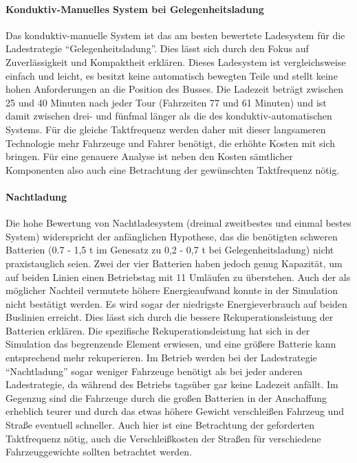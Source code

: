 \paragraph{Konduktiv-Manuelles System bei Gelegenheitsladung} Das konduktiv-manuelle System ist das am besten bewertete Ladesystem für die Ladestrategie "`Gelegenheitsladung"'. Dies lässt sich durch den Fokus auf Zuverlässigkeit und Kompaktheit erklären. Dieses Ladesystem ist vergleichsweise einfach und leicht, es besitzt keine automatisch bewegten Teile und stellt keine hohen Anforderungen an die Position des Busses. Die Ladezeit beträgt zwischen 25 und 40 Minuten nach jeder Tour (Fahrzeiten 77 und 61 Minuten) und ist damit zwischen drei- und fünfmal länger als die des konduktiv-automatischen Systems. Für die gleiche Taktfrequenz werden daher mit dieser langsameren Technologie mehr Fahrzeuge und Fahrer benötigt, die erhöhte Kosten mit sich bringen. Für eine genauere Analyse ist neben den Kosten sämtlicher Komponenten also auch eine Betrachtung der gewünschten Taktfrequenz nötig.

\paragraph{Nachtladung} Die hohe Bewertung von Nachtladesystem (dreimal zweitbestes und einmal bestes System) widerspricht der anfänglichen Hypothese, das die benötigten schweren Batterien (0.7 - 1,5 t im Genesatz zu 0,2 - 0,7 t bei Gelegenheitsladung) nicht praxistauglich seien. Zwei der vier Batterien haben jedoch genug Kapazität, um auf beiden Linien einen Betriebstag mit 11 Umläufen zu überstehen. Auch der als möglicher Nachteil vermutete höhere Energieaufwand konnte in der Simulation nicht bestätigt werden. Es wird sogar der niedrigste Energieverbrauch auf beiden Buslinien erreicht. Dies lässt sich durch die bessere Rekuperationsleistung der Batterien erklären. Die spezifische Rekuperationsleistung hat sich in der Simulation das begrenzende Element erwiesen, und eine größere Batterie kann entsprechend mehr rekuperieren. Im Betrieb werden bei der Ladestrategie "`Nachtladung"' sogar weniger Fahrzeuge benötigt als bei jeder anderen Ladestrategie, da während des Betriebs tagsüber gar keine Ladezeit anfällt. Im Gegenzug sind die Fahrzeuge durch die großen Batterien in der Anschaffung erheblich teurer und durch das etwas höhere Gewicht verschleißen Fahrzeug und Straße eventuell schneller. Auch hier ist eine Betrachtung der geforderten Taktfrequenz nötig, auch die Verschleißkosten der Straßen für verschiedene Fahrzeuggewichte sollten betrachtet werden.

